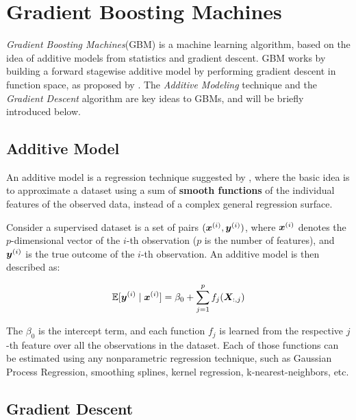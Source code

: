 \chapter{Gradient Boosting Machines}
\label{cap:boosting-intro}

\textit{Gradient Boosting Machines}(GBM) is a machine learning algorithm, based on the idea of additive models from statistics and gradient descent. GBM works by building a forward stagewise additive model by performing gradient descent in function space, as proposed by \cite{gbmdef}. The \textit{Additive Modeling} technique and the \textit{Gradient Descent} algorithm are key ideas to GBMs, and will be briefly introduced below.

\section{Additive Model}
An additive model is a  regression technique suggested by , where the basic idea is to approximate a dataset using a sum of \textbf{smooth functions} of the individual features of the observed data, instead of a complex general regression surface.

Consider a supervised dataset is a set of pairs $(\bm{x}^{(i)},\bm{y}^{(i)})$, where $\bm{x}^{(i)}$ denotes the $p$-dimensional vector of the $i$-th observation ($p$ is the number of features), and $\bm{y}^{(i)}$ is the true outcome of the $i$-th observation. An additive model is then described as:

\begin{equation}\label{eq:additive}
\mathbb{E}[\bm{y}^{(i)}\mid \bm{x}^{(i)}] = \beta_0 + \sum_{j=1}^pf_j(\bm{X}_{:, j})
\end{equation}

The $\beta_0$ is the intercept term, and each function $f_j$ is learned from the respective $j$-th feature over all the observations in the dataset. Each of those functions can be estimated using any nonparametric regression technique, such as Gaussian Process Regression, smoothing splines, kernel regression, k-nearest-neighbors, etc.

\section{Gradient Descent}
\label{Gradient Descent}

